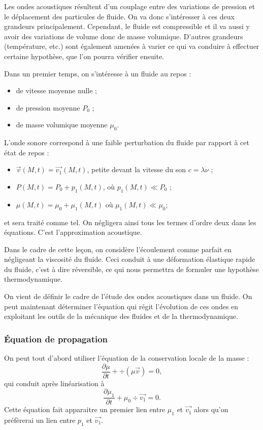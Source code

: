 Les ondes acoustiques résultent d'un couplage entre des variations de pression et le déplacement des particules de fluide.
On va donc s'intéresser à ces deux grandeurs principalement.
Cependant, le fluide est compressible et il va aussi y avoir des variations de volume donc de masse volumique.
D'autres grandeurs (température, etc.) sont également amenées à varier ce qui va conduire à effectuer certaine hypothèse, que l'on pourra vérifier ensuite.

Dans un premier temps, on s'intéresse à un fluide au repos :
\begin{itemize}
\item de vitesse moyenne nulle ;
\item de pression moyenne $P_0$ ;
\item de masse volumique moyenne $\mu_0$.
\end{itemize}

L'onde sonore correspond à une faible perturbation du fluide par rapport à cet état de repos :
\begin{itemize}
\item $\overrightarrow{v}(M, t) = \overrightarrow{v_1}(M, t)$, petite devant la vitesse du son $c=\lambda\nu$ ;
\item $P(M, t) = P_0 + p_1(M, t)$, où $p_1(M, t) \ll P_0$ ;
\item $\mu(M, t) = \mu_0 + \mu_1(M,t)$ où $\mu_1(M, t) \ll \mu_0$;
\end{itemize}
et sera traité comme tel.
On négligera ainsi tous les termes d'ordre deux dans les équations.
C'est l'approximation acoustique.

Dans le cadre de cette leçon, on considère l'écoulement comme parfait en négligeant la viscosité du fluide.
Ceci conduit à une déformation élastique rapide du fluide, c'est à dire réversible, ce qui nous permettra de formuler une hypothèse thermodynamique.

\begin{transition}
On vient de définir le cadre de l'étude des ondes acoustiques dans un fluide.
On peut maintenant déterminer l'équation qui régit l'évolution de ces ondes en exploitant les outils de la mécanique des fluides et de la thermodynamique.
\end{transition}

\subsubsection{Équation de propagation}

On peut tout d'abord utiliser l'équation de la conservation locale de la masse :
\begin{equation*}
\frac{\partial \mu}{\partial t} + \div(\mu\overrightarrow{v}) = 0,
\end{equation*}
qui conduit après linéarisation à
\begin{equation*}
\frac{\partial \mu_1}{\partial t} + \mu_0\div\overrightarrow{v_1} = 0.
\end{equation*}
Cette équation fait apparaitre un premier lien entre $\mu_1$ et $\overrightarrow{v_1}$ alors qu'on préfèrerai un lien entre $p_1$ et $\overrightarrow{v_1}$.

